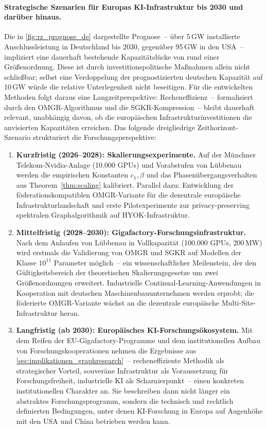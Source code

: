 ﻿\documentclass[12pt, a4paper, openany]{report}
\begin{document}
\paragraph{Strategische Szenarien für Europas KI-Infrastruktur bis 2030
  und darüber hinaus.}
Die in \cref{fig:rz_prognose_de} dargestellte Prognose~-- über 5\,GW
installierte Anschlussleistung in Deutschland bis 2030, gegenüber
95\,GW in den USA~-- impliziert eine dauerhaft bestehende
Kapazitätslücke von rund einer Größenordnung.  Diese ist durch
investitionspolitische Maßnahmen allein nicht schließbar; selbst eine
Verdoppelung der prognostizierten deutschen Kapazität auf 10\,GW würde
die relative Unterlegenheit nicht beseitigen.  Für die entwickelten
Methoden folgt daraus eine Langzeitperspektive: Recheneffizienz~--
formalisiert durch den OMGR-Algorithmus und die SGKR-Kompression~--
bleibt dauerhaft relevant, unabhängig davon, ob die europäischen
Infrastrukturinvestitionen die anvisierten Kapazitäten erreichen.
Das folgende dreigliedrige Zeithorizont-Szenario strukturiert die
Forschungsperspektive:
\begin{enumerate}[label=(\alph*)]
  \item \textbf{Kurzfristig (2026--2028): Skalierungsexperimente.}
    Auf der Münchner Telekom-Nvidia-Anlage (10.000 GPUs) und
    Vorabstufen von Lübbenau werden die empirischen Konstanten
    $c_1, \beta$ und das Phasenübergangsverhalten aus
    Theorem~\ref{thm:scaling} kalibriert.  Parallel dazu: Entwicklung
    der föderationskompatiblen OMGR-Variante für die dezentrale
    europäische Infrastrukturlandschaft und erste Pilotexperimente zur
    privacy-preserving spektralen Graphalgorithmik auf
    HYOK-Infrastruktur.
  \item \textbf{Mittelfristig (2028--2030): Gigafactory-Forschungsinfrastruktur.}
    Nach dem Anlaufen von Lübbenau in Vollkapazität (100.000 GPUs,
    200\,MW) wird erstmals die Validierung von OMGR und SGKR auf
    Modellen der Klasse $10^{11}$ Parameter möglich~-- ein
    wissenschaftlicher Meilenstein, der den Gültigkeitsbereich der
    theoretischen Skalierungsgesetze um zwei Größenordnungen erweitert.
    Industrielle Continual-Learning-Anwendungen in Kooperation mit
    deutschen Maschinenbauunternehmen werden erprobt; die föderierte
    OMGR-Variante wächst an die dezentrale europäische
    Multi-Site-Infrastruktur heran.
  \item \textbf{Langfristig (ab 2030): Europäisches KI-Forschungsökosystem.}
    Mit dem Reifen der EU-Gigafactory-Programme und dem institutionellen
    Aufbau von Forschungskooperationen nehmen die Ergebnisse aus
    \cref{sec:implikationen_graphresearch}~-- recheneffiziente Methodik
    als strategischer Vorteil, souveräne Infrastruktur als Voraussetzung
    für Forschungsfreiheit, industrielle KI als
    Scharnierpunkt~-- einen konkreten institutionellen Charakter an.
    Sie beschreiben dann nicht länger ein abstraktes Forschungsprogramm,
    sondern die technisch und rechtlich definierten Bedingungen, unter
    denen KI-Forschung in Europa auf Augenhöhe mit den USA und China
    betrieben werden kann.
\end{enumerate}
\end{document}

